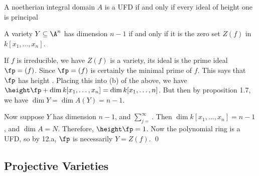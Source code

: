 





\begin{prop}
A noetherian integral domain $A$ is a UFD if and only if every ideal of height one is principal
\end{prop}


\begin{prop}
A variety $Y \subseteq \A^n$ has dimension $n-1$ if and only if it is the zero set $Z(f)$ in $k[x_1,\ldots,x_n]$. 
\end{prop}

\pf If $f$ is irreducible, we have $Z(f)$ is a variety, its ideal is the prime ideal $\fp= (f)$. Since $\fp= (f)$ is certainly the minimal prime of $f$. This says that $\fp$ has height . Placing this into (b) of the above, we have $\height \fp + \dim k[x_1,\ldots,x_n]= \dim k[x_1,\ldots,n]$. But then by proposition 1.7, we have $\dim Y= \dim A(Y)= n-1$. 

Now suppose $Y$ has dimension $n-1$, and $\sum_{j=}^\infty$. Then $\dim k[x_1,\ldots,x_n]= n-1$, and $\dim A= N$. Therefore, $\height \fp= 1$. Now the polynomial ring is a UFD, so by 12.a, $\fp$ is necessarily $Y= Z(f)$. \qed \\













\subsection{Projective Varieties}

